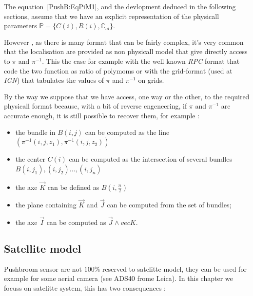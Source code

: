 The equation~\ref{PushB:EqPiM1}, and the devlopment deduced in the following sections,
assume that we have an explicit representation of the physicall parameters
$\mathbb{P}=\{C(i),R(i),\mathbb{C}_{al}\}$.

However , as there is many format that can be fairly complex, it's very
common that the localisation are provided as non physicall model that
give directly access to $\pi$ and $\pi^{-1}$. This the case 
for example with the well known \emph{RPC} format that code
the two function as ratio of polymoms or with the grid-format
(used at \emph{IGN}) that tabulates the values of $\pi$ and $\pi^{-1}$ on grids.

By the way we suppose that we have access, one way or the other,
to the required physicall format because, with a bit of reverse
engeneering, if $\pi$ and $\pi^{-1}$ are accurate enough, it is
still possible to recover them, for example :


\begin{itemize}
	\item the bundle in $B(i,j)$  can be computed as the line $ (\pi^{-1}(i,j,z_1),\pi^{-1}(i,j,z_2)) $
	\item the center $C(i)$ can be computed as the intersection of several bundles $B(i,j_1),(i,j_2) \dots,(i,j_n)$
	\item the axe $\vec{K}$ can be defined as  $B(i,\frac{n}{2})$
        \item the plane containing $\vec{K}$ and $\vec{J}$ can be computed from the set of bundles;
	\item the axe $\vec{I}$ can be computed as $\vec{J} \wedge vec{K}$.
\end{itemize}




\subsection{Satellite model}

Pushbroom sensor are not $100\%$ reserved to satelitte model, they can be used for example for some
aerial camera (see ADS40 frome Leica).
In this chapter we  focuss on satelitte system, this has two consequences :

